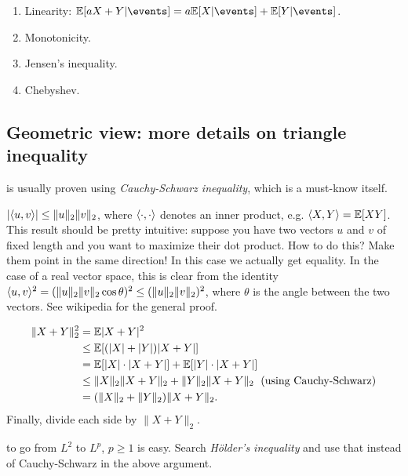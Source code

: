 \documentclass{article}
\begin{document}
\begin{enumerate}
  \item Linearity: $\E[a X + Y|\events] = a \E[X|\events] + \E[Y|\events]$.
  \item Monotonicity.
  \item Jensen's inequality.
  \item Chebyshev.
\end{enumerate}


\subsection{Geometric view: more details on triangle inequality}

 is usually proven using \emph{Cauchy-Schwarz inequality}, which is a must-know itself.

 $|\langle u, v\rangle| \le \| u \|_2 \| v \|_2$, where $\langle \cdot, \cdot\rangle$ denotes an inner product, e.g. $\langle X, Y\rangle = {\mathbb E}[X Y]$. This result should be pretty intuitive: suppose you have two vectors $u$ and $v$ of fixed length and you want to maximize their dot product. How to do this? Make them point in the same direction! In this case we actually get equality. In the case of a real vector space, this is clear from the identity $\langle u, v\rangle^2 = (\| u \|_2 \| v \|_2 \cos \theta)^2 \le (\| u \|_2 \| v \|_2)^2$, where $\theta$ is the angle between the two vectors. See wikipedia for the general proof.


\begin{align*}
\| X + Y \|_2^2 &= {\mathbb E} | X + Y |^2 \\
&\le {\mathbb E} [ (|X| + |Y|) |X + Y| ] \\
&= {\mathbb E} [ |X|\cdot|X + Y| ] + {\mathbb E} [ |Y|\cdot|X + Y| ] \\
&\le \| X \|_2 \|X + Y\|_2 + \| Y \|_2 \|X + Y\|_2 \;\text{ (using Cauchy-Schwarz)}  \\
&= ( \| X \|_2 + \| Y \|_2 ) \|X + Y\|_2.
\end{align*} 
Finally, divide each side by $\|X + Y\|_2$.

 to go from $L^2$ to $L^p$, $p \ge 1$ is easy. Search \emph{H\"{o}lder's inequality} and use that instead of Cauchy-Schwarz in the above argument. 
\end{document}
